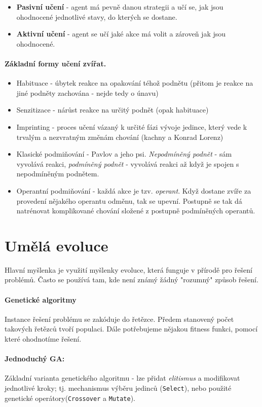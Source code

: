 \documentclass[a4paper]{article}      %
\begin{document}
\begin{itemize}
\item \textbf{Pasivní učení} - agent má pevně danou strategii a učí se, jak jsou ohodnocené jednotlivé stavy, do kterých se dostane.
\item \textbf{Aktivní učení} - agent se učí jaké akce má volit a zároveň jak jsou ohodnocené.
\end{itemize}

\paragraph{Základní formy učení zvířat.}
\begin{itemize}
\item Habituace - úbytek reakce na opakování téhož podnětu (přitom je reakce na jiné podněty zachována - nejde tedy o únavu)
\item Senzitizace - nárůst reakce na určitý podnět (opak habituace)
\item Imprinting - proces učení vázaný k určité fázi vývoje jedince, který vede k trvalým a nezvratným změnám chování (kachny a Konrad Lorenz)
\item Klasické podmiňování - Pavlov a jeho psi. \emph{Nepodmíněný podnět} - sám vyvolává reakci, \emph{podmíněný podnět} - vyvolává reakci až když je spojen s nepodmíněným podnětem.
\item Operantní podmiňování - každá akce je tzv. \emph{operant}. Když dostane zvíře za provedení nějakého operantu odměnu, tak se upevní. Postupně se tak dá natrénovat komplikované chování složené z postupně podmíněných operantů.
\end{itemize}

\section{Umělá evoluce}
Hlavní myšlenka je využití myšlenky evoluce, která funguje v přírodě pro řešení problémů.
Často se používá tam, kde není známý žádný "rozumný" způsob řešení.

\paragraph{Genetické algoritmy}
Instance řešení problému se zakóduje do řetězce. Předem stanovený počet takových řetězců tvoří populaci.
Dále potřebujeme nějakou fitness funkci, pomocí které ohodnotíme řešení.

\paragraph{Jednoduchý GA:}
Základní varianta genetického algoritmu - lze přidat \emph{elitismus} a modifikovat jednotlivé kroky; tj. mechanismus výběru jedinců (\verb+Select+), nebo použité genetické operátory(\verb+Crossover+ a \verb+Mutate+).
\end{document}
